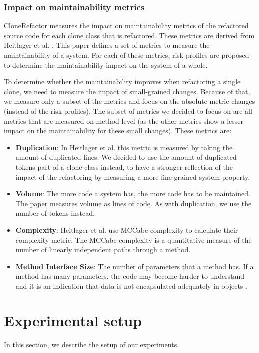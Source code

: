 \documentclass[sigconf,review, table]{acmart}
\begin{document}
\subsubsection{Impact on maintainability metrics} \label{sec:metrics}
CloneRefactor measures the impact on maintainability metrics of the refactored source code for each clone class that is refactored. These metrics are derived from Heitlager et al. \cite{heitlager2007practical}. This paper defines a set of metrics to measure the maintainability of a system. For each of these metrics, risk profiles are proposed to determine the maintainability impact on the system of a whole.

To determine whether the maintainability improves when refactoring a single clone, we need to measure the impact of small-grained changes. Because of that, we measure only a subset of the metrics \cite{heitlager2007practical} and focus on the absolute metric changes (instead of the risk profiles). The subset of metrics we decided to focus on are all metrics that are measured on method level (as the other metrics show a lesser impact on the maintainability for these small changes). These metrics are:
\begin{itemize}
\item \textbf{Duplication}: In Heitlager et al. \cite{heitlager2007practical} this metric is measured by taking the amount of duplicated lines. We decided to use the amount of duplicated tokens part of a clone class instead, to have a stronger reflection of the impact of the refactoring by measuring a more fine-grained system property.
\item \textbf{Volume}: The more code a system has, the more code has to be maintained. The paper \cite{heitlager2007practical} measures volume as lines of code. As with duplication, we use the number of tokens instead.
\item \textbf{Complexity}: Heitlager et al. use MCCabe complexity \cite{mccabe1976complexity} to calculate their complexity metric. The MCCabe complexity is a quantitative measure of the number of linearly independent paths through a method.
\item \textbf{Method Interface Size}: The number of parameters that a method has. If a method has many parameters, the code may become harder to understand and it is an indication that data is not encapsulated adequately in objects \cite{fowler2018refactoring}.
\end{itemize}

\section{Experimental setup}
In this section, we describe the setup of our experiments.
\end{document}

